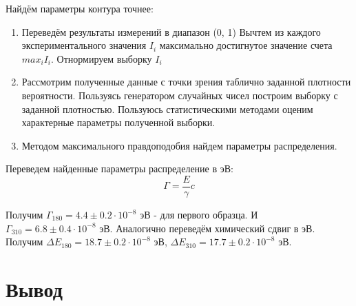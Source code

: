 \documentclass[a4paper, 14pt]{article}
\begin{document}
Найдём параметры контура точнее:
\begin{enumerate}
    \item Переведём результаты измерений в диапазон (0, 1)
          \subitem Вычтем из каждого экспериментального значения $I_{i}$ максимально достигнутое значение счета $max_{i} I_{i}$.
          \subitem Отнормируем выборку $I_{i}$
    \item Рассмотрим полученные данные с точки зрения таблично заданной плотности вероятности. Пользуясь генератором случайных чисел построим выборку с заданной плотностью. Пользуюсь статистическими методами
          оценим характерные параметры полученной выборки.
    \item Методом максимального правдоподобия найдем параметры распределения. 
\end{enumerate}


Переведем найденные параметры распределение в $\text{эВ}$:
\begin{equation}
    \Gamma = \frac{E}{\gamma}{c} 
\end{equation}

Получим $\Gamma_{180} = 4.4 \pm 0.2 \cdot 10^{-8}  \text{ эВ}$ - 
для первого образца. И $\Gamma_{310} =  6.8 \pm 0.4 \cdot 10^{-8} \text{ эВ}$. 
Аналогично переведём химический сдвиг в $ \text{эВ}$. Получим $\Delta E_{180} = 18.7 \pm 0.2 \cdot 10^{-8} \text{ эВ}$,
$\Delta E_{310} = 17.7 \pm 0.2 \cdot 10^{-8} \text{ эВ}$.





\section*{\textcolor{header}{Вывод}}
\end{document}
